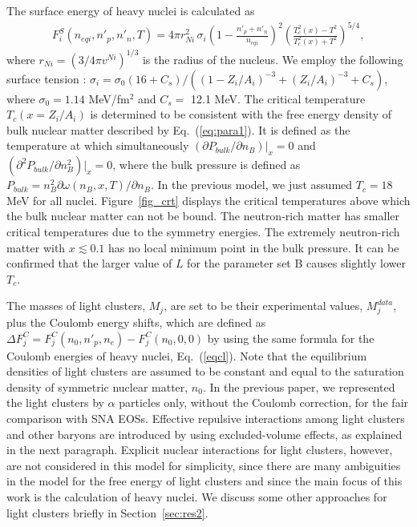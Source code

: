 \documentclass[preprint]{revtex4}
\begin{document}
The surface energy of heavy nuclei is calculated as
\begin{eqnarray}
F_i^{S} (n_{eqi},n'_p,n'_n,T) = 4 \pi {r^2_{Ni}} \, \sigma_i \left(1-\displaystyle{\frac{n'_p+n'_n}{n_{eqi}}} \right)^2 \left( \displaystyle{\frac{T^2_c(x)-T^2}{T^2_c(x)+T^2}} \right)^{5/4} ,   \label{eqsf}
\end{eqnarray}  
where $r_{Ni} = ( 3/4 \pi v^{Ni})^{1/3}$  is the radius of the nucleus.
We employ
the following surface tension  \cite{agrawal14b} :
$\sigma_{i} =\sigma_0 (16 + C_s) /\left( (1-Z_i/A_i)^{-3} + (Z_i/A_i)^{-3}  +C_s \right)$,  %
where $\sigma_0=1.14$ MeV/fm$^2$ and  $C_s =$ 12.1 MeV.
The  critical  temperature $T_c(x=Z_i/A_i)$ is determined to be consistent with the free energy density of bulk nuclear matter described by Eq.~(\ref{eq:para1}). 
It is  defined as the temperature  at which simultaneously $(\partial P_{bulk}/\partial n_B)|_{x}=0$ and $(\partial^2 P_{bulk}/\partial n_B^2)|_{x}=0$,
where the bulk pressure is defined as $P_{bulk}=n_B^2 \partial \omega(n_B,x,T)/\partial n_B$. In the previous model, we just assumed $T_c=18$ MeV for all nuclei.
 Figure~\ref{fig_crt} displays the critical temperatures  above which the bulk nuclear matter can not be bound.
The neutron-rich matter has smaller critical temperatures due to the symmetry energies.
The extremely neutron-rich matter with $x \lesssim 0.1$ has no local minimum point in the bulk pressure. 
It can be confirmed that the larger value of $L$ for the parameter set B  causes slightly lower $T_c$. 


The masses of  light clusters, $M_j$,  are set to be their experimental values, $M_j^{data} $, plus the Coulomb energy shifts, which are defined as $\Delta F^C_{j}=F_j^C(n_0,n'_p,n_e)-F_j^C(n_0,0,0) $ by using the same formula for the Coulomb energies  of heavy nuclei, Eq.~(\ref{eqcl}). 
Note that the equilibrium densities of light clusters are assumed to be  constant and equal to the saturation density of symmetric nuclear matter, $n_0$.
In the previous paper,  we represented the light clusters by $\alpha$ particles only, without the Coulomb correction,  for the fair comparison with SNA EOSs.
{%
Effective repulsive interactions among light clusters and other baryons are introduced by using excluded-volume effects, as explained in the next paragraph.
Explicit nuclear interactions for light clusters, however, are not considered in this model for simplicity, since there are many ambiguities in the model for the free energy of light clusters and since the main focus of this work is the calculation of heavy nuclei.
We discuss some other approaches for light clusters  briefly in Section~\ref{sec:res2}.}
\end{document}
